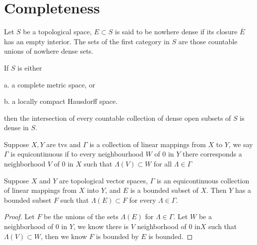 \chapter{Completeness}

\begin{definition}
    Let $S$ be a topological space, $E\subset S$ is said to be nowhere dense if its closure $\overline{E}$ has an empty interior. The sets of the first category in $S$ are those countable unions of nowhere dense sets.
\end{definition}

\begin{theorem}
    If $S$ is either\par
    a. a complete metric space, or\par
    b. a locally compact Hausdorff space.\par
    then the intersection of every countable collection of dense open subsets of $S$ is dense in $S$.
\end{theorem}

\begin{definition}
    Suppose $X,Y$ are tvs and $\Gamma$ is a collection of linear mappings from $X$ to $Y$, we say $\Gamma$ is equicontinuous if to every neighbourhood $W$ of $0$ in $Y$ there corresponds a neighborhood $V$ of $0$ in $X$ such that $\Lambda(V) \subset W$ for all $\Lambda\in \Gamma$
\end{definition}

\begin{theorem}
    Suppose $X$ and $Y$ are topological vector spaces, $\Gamma $ is an equicontinuous collection of linear mappings from $X$ into $Y$, and $E$ is a bounded subset of $X$. Then $Y$ has a bounded subset $F$ such that $\Lambda(E)\subset F$ for every $\Lambda \in \Gamma$.
\end{theorem}
\begin{proof}
    Let $F$ be the unions of the sets $\Lambda(E)$ for $\Lambda \in \Gamma$. Let $W$ be a neighborhood of $0$ in $Y$, we know there is $V$ neighborhood of $0$ in$X$ such that $\Lambda(V) \subset W$, then we know $F$ is bounded by $E$ is bounded.
\end{proof}


